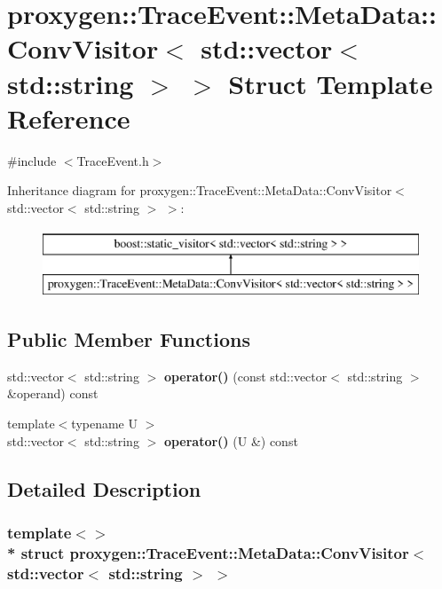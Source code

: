 \section{proxygen\+:\+:Trace\+Event\+:\+:Meta\+Data\+:\+:Conv\+Visitor$<$ std\+:\+:vector$<$ std\+:\+:string $>$ $>$ Struct Template Reference}
\label{structproxygen_1_1TraceEvent_1_1MetaData_1_1ConvVisitor_3_01std_1_1vector_3_01std_1_1string_01_4_01_4}


{\ttfamily \#include $<$Trace\+Event.\+h$>$}

Inheritance diagram for proxygen\+:\+:Trace\+Event\+:\+:Meta\+Data\+:\+:Conv\+Visitor$<$ std\+:\+:vector$<$ std\+:\+:string $>$ $>$\+:\begin{figure}[H]
\begin{center}
\leavevmode
\includegraphics[height=2.000000cm]{structproxygen_1_1TraceEvent_1_1MetaData_1_1ConvVisitor_3_01std_1_1vector_3_01std_1_1string_01_4_01_4}
\end{center}
\end{figure}
\subsection*{Public Member Functions}
\begin{DoxyCompactItemize}
\item 
std\+::vector$<$ std\+::string $>$ {\bf operator()} (const std\+::vector$<$ std\+::string $>$ \&operand) const 
\item 
{\footnotesize template$<$typename U $>$ }\\std\+::vector$<$ std\+::string $>$ {\bf operator()} (U \&) const 
\end{DoxyCompactItemize}


\subsection{Detailed Description}
\subsubsection*{template$<$$>$\\*
struct proxygen\+::\+Trace\+Event\+::\+Meta\+Data\+::\+Conv\+Visitor$<$ std\+::vector$<$ std\+::string $>$ $>$}



